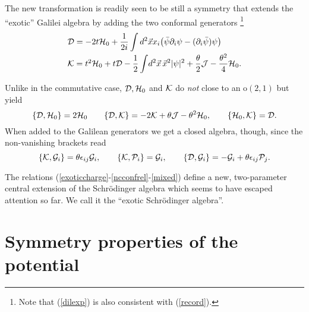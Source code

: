 \documentclass[a4paper,11pt]{article}
\let\ssection=\section
\renewcommand{\section}{\setcounter{equation}{0}\ssection}
\def\p{{\partial}}
\def\vx{{\vec x}}
\begin{document}
The new transformation is readily seen to be still a symmetry that extends the
``exotic'' Galilei algebra
by adding the two conformal generators \footnote{Note
that (\ref{dilexp}) is also consistent with (\ref{record}).}
\begin{equation}
     \begin{array}{ll}
     {\cal D}=-2t{\cal H}_{0}+\displaystyle\frac{1}{2i}\int d^2\vx x_{i}
     \big(\bar{\psi}\p_{i}\psi-(\p_{i}\bar{\psi})\psi\big)
     \\[8pt]
     {\cal K}=
     t^2{\cal H}_{0}+t{\cal D}-
     \displaystyle\frac{1}{2}\int\!d^2\vx\,\vx^2|\psi|^2
     +\frac{\theta}{2}{\cal J}-\frac{\theta^2}{4}{\cal H}_{0}.
     \label{ncconf}
     \end{array}
\end{equation}

Unlike in the commutative case,
${\cal D}, {\cal H}_{0}$ and ${\cal K}$ do {\it not}
close to an o$(2,1)$ \cite{JHN} but yield
\begin{equation}
	\{{\cal D},{\cal H}_{0}\}=2{\cal H}_{0}
	\qquad
	\{{\cal D},{\cal K}\}=-2{\cal K}+\theta{\cal J}-\theta^2{\cal H}_{0},
	\qquad
	\{{\cal H}_{0},{\cal K}\}={\cal D}.
\label{ncconfrel}
\end{equation}
When added to the Galilean generators we get a closed
algebra, though, since the non-vanishing brackets read
\begin{equation}
     \{{\cal K},{\cal G}_{i}\}=\theta\epsilon_{ij}{\cal G}_{i},
     \qquad
     \{{\cal K},{\cal P}_{i}\}={\cal G}_{i},
     \qquad
     \{{\cal D},{\cal G}_{i}\}=-{\cal G}_{i}+\theta\epsilon_{ij}{\cal P}_{j}.
     \label{mixed}
\end{equation}


The relations (\ref{exoticcharge}-\ref{ncconfrel}-\ref{mixed})
define a new, two-parameter central extension of the Schr\"odinger
algebra which seems to have escaped attention so far.
We call it the ``exotic Schr\"odinger algebra''.



\section{Symmetry properties of the potential}
\end{document}
